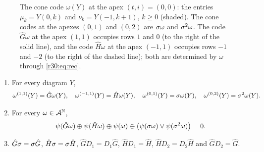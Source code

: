 \begin{figure}[ht]
\centering
{}
\caption{The cone code $\omega(Y)$ at the apex $(t,i)=(0,0)$: the entries $\mu_k=Y(0,k)$ and $\nu_k=Y(-1,k+1)$, $k\ge0$ (shaded). The cone codes at the apexes $(0,1)$ and $(0,2)$ are $\sigma\omega$ and $\sigma^2\omega$. The code $\hat G\omega$ at the apex $(1,1)$ occupies rows $1$ and $0$ (to the right of the solid line), and the code $\hat H\omega$ at the apex $(-1,1)$ occupies rows $-1$ and $-2$ (to the right of the dashed line); both are determined by $\omega$ through \eqref{r30:eq:rec}.}
\label{r30:fig:cone}
\end{figure}

\begin{lemma}\label{r30:lem:I}
\begin{enumerate}
\item For every diagram $Y$,
\[
\omega^{(1,1)}(Y)=\hat G\omega(Y),\quad \omega^{(-1,1)}(Y)=\hat H\omega(Y),\quad \omega^{(0,1)}(Y)=\sigma\omega(Y),\quad \omega^{(0,2)}(Y)=\sigma^2\omega(Y).
\]
\item For every $\omega\in\mathcal{A}^{\mathbb{N}}$,
\begin{equation}\label{r30:eq:I}
\psi(\hat G\omega)\oplus\psi(\hat H\omega)\oplus\psi(\omega)\oplus\bigl(\psi(\sigma\omega)\vee\psi(\sigma^2\omega)\bigr)=0.
\end{equation}
\item $\hat G\sigma=\sigma\hat G$, $\hat H\sigma=\sigma\hat H$, $\hat GD_1=D_1\hat G$, $\hat HD_1=\hat H$, $\hat HD_2=D_2\hat H$ and $\hat GD_2=\hat G$.
\end{enumerate}
\end{lemma}

